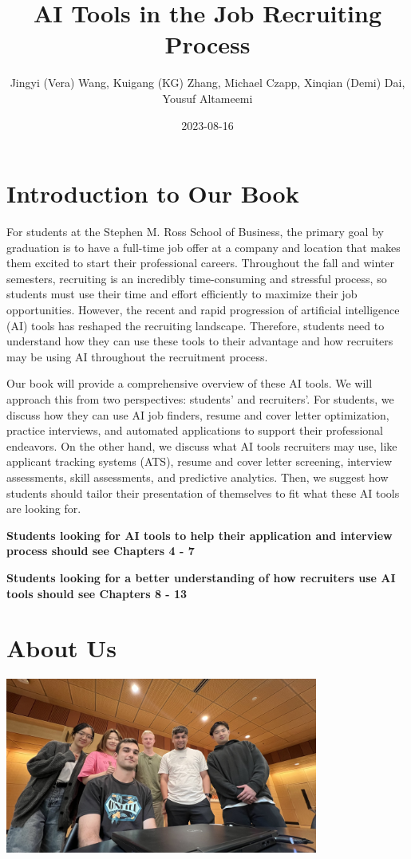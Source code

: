 \documentclass[
]{book}
\title{AI Tools in the Job Recruiting Process}
\author{Jingyi (Vera) Wang, Kuigang (KG) Zhang, Michael Czapp, Xinqian (Demi) Dai, Yousuf Altameemi}
\date{2023-08-16}
\begin{document}
\maketitle

{
\setcounter{tocdepth}{1}
\tableofcontents
}
\hypertarget{introduction-to-our-book}{%
\chapter{Introduction to Our Book}\label{introduction-to-our-book}}

For students at the Stephen M. Ross School of Business, the primary goal by graduation is to have a full-time job offer at a company and location that makes them excited to start their professional careers. Throughout the fall and winter semesters, recruiting is an incredibly time-consuming and stressful process, so students must use their time and effort efficiently to maximize their job opportunities. However, the recent and rapid progression of artificial intelligence (AI) tools has reshaped the recruiting landscape. Therefore, students need to understand how they can use these tools to their advantage and how recruiters may be using AI throughout the recruitment process.

Our book will provide a comprehensive overview of these AI tools. We will approach this from two perspectives: students' and recruiters'. For students, we discuss how they can use AI job finders, resume and cover letter optimization, practice interviews, and automated applications to support their professional endeavors. On the other hand, we discuss what AI tools recruiters may use, like applicant tracking systems (ATS), resume and cover letter screening, interview assessments, skill assessments, and predictive analytics. Then, we suggest how students should tailor their presentation of themselves to fit what these AI tools are looking for.

\textbf{Students looking for AI tools to help their application and interview process should see Chapters 4 - 7}

\textbf{Students looking for a better understanding of how recruiters use AI tools should see Chapters 8 - 13}

\hypertarget{about-us}{%
\chapter{About Us}\label{about-us}}

\includegraphics[width=4.04167in,height=\textheight]{Team Photo.jpg}
\end{document}
